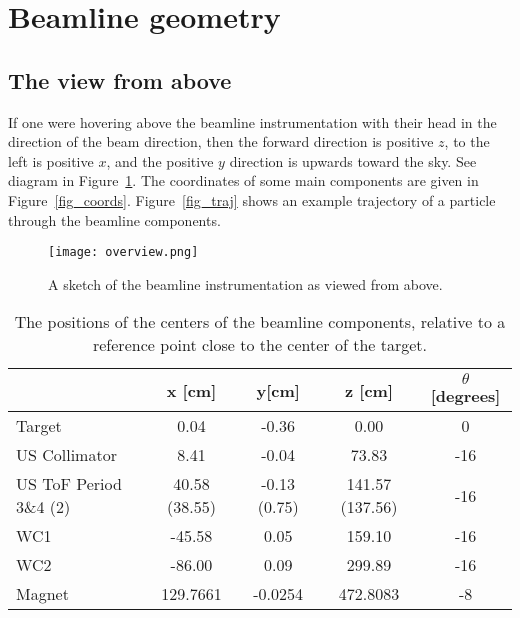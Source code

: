 \section{Beamline geometry}

\subsection{The view from above}

If one were hovering above the beamline instrumentation with their head in the direction of the beam direction, then the forward direction is positive $z$, to the left is positive $x$, and the positive $y$ direction is upwards toward the sky. See diagram in Figure~\ref{fig_overview}. The coordinates of some main components are given in Figure~\ref{fig_coords}. Figure~\ref{fig_traj} shows an example trajectory of a particle through the beamline components.
\begin{figure}[h]	  
 \centering 
        	\texttt{[image: overview.png]}	 
   \caption[short]{A sketch of the beamline instrumentation as viewed from above.}
   \label{fig_overview}
  \end{figure}


\begin{table}[ht]
\centering
\begin{tabularx}{0.95\textwidth}{l | c | c | c | c}
\toprule
& \textbf{x [cm]} & \textbf{y[cm]} & z [cm] & $\theta$ [degrees] \\
\midrule
Target & 0.04 & -0.36 & 0.00 & 0\\
US Collimator  & 8.41 & -0.04  & 73.83 & -16\\
US ToF Period 3\&4 (2) & 40.58 (38.55) & -0.13 (0.75) & 141.57 (137.56) & -16\\
WC1 & -45.58 & 0.05 & 159.10 & -16\\
WC2 & -86.00 & 0.09 & 299.89 & -16 \\
Magnet & 129.7661 & -0.0254 & 472.8083 & -8\\

\bottomrule
\end{tabularx}
\caption{The positions of the centers of the beamline components, relative to a reference point close to the center of the target.}
\label{tab:coords}
\end{table}

